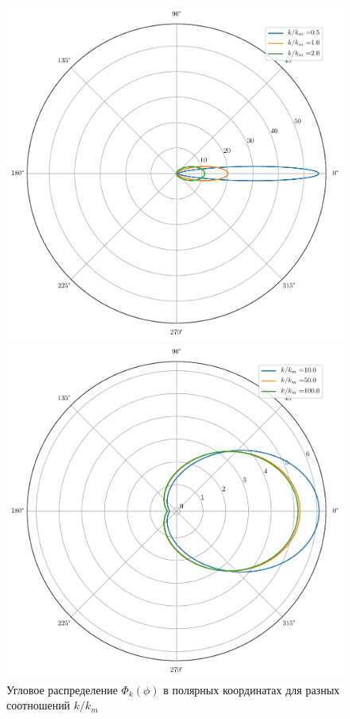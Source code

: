 \begin{figure}[h!]
	\begin{minipage}{0.49\linewidth}
			\centering
			\includegraphics[width=\linewidth]{fig/full_angles1.pdf}	
	\end{minipage}
	\hfill
	\begin{minipage}{0.49\linewidth}
			\centering
			\includegraphics[width=\linewidth]{fig/full_angles2.pdf}
	\end{minipage}
	\caption{Угловое распределение $\Phi_k(\phi)$ в полярных координатах для разных соотношений $k/k_m$}
	\label{fig:full_angles}
\end{figure}


